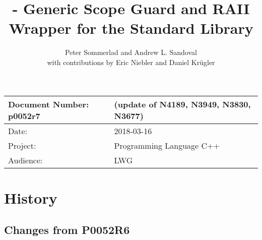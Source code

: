 \documentclass[ebook,11pt,article]{memoir}
\title{\papernumber{} - Generic Scope Guard and RAII Wrapper for the Standard Library}
\author{Peter Sommerlad and Andrew L. Sandoval\\with contributions by Eric Niebler and Daniel Kr\"ugler}
\date{\paperdate}                        %
\newcommand{\papernumber}{p0052r7}
\newcommand{\paperdate}{2018-03-16}
\begin{document}
\maketitle
\begin{tabular}[t]{|l|l|}\hline 
Document Number: \papernumber &   (update of N4189, N3949, N3830, N3677)\\\hline
Date: & \paperdate \\\hline
Project: & Programming Language C++\\\hline 
Audience: & LWG\\\hline
\end{tabular}

\chapter{History}
\section{Changes from P0052R6}
\end{document}
